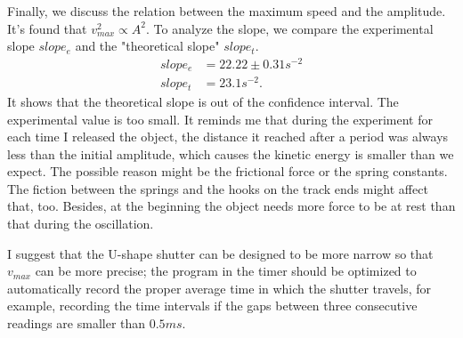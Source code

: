    Finally, we discuss the relation between the maximum speed and the amplitude. It's found that $v_{max}^2\propto A^2$. To analyze the slope, we compare the experimental slope $slope_e$ and the "theoretical slope" $slope_t$.
    \[
    \begin{split}
        slope_e&=22.22\pm0.31s^{-2}\\
        slope_t&=23.1s^{-2}.
    \end{split}
    \]
    It shows that the theoretical slope is out of the confidence interval. The experimental value is too small. It reminds me that during the experiment for each time I released the object, the distance it reached after a period was always less than the initial amplitude, which causes the kinetic energy is smaller than we expect. The possible reason might be the frictional force or the spring constants. The fiction between the springs and the hooks on the track ends might affect that, too. Besides, at the beginning the object needs more force to be at rest than that during the oscillation.
    
    I suggest that the U-shape shutter can be designed to be more narrow so that $v_{max}$ can be more precise; the program in the timer should be optimized to automatically record the proper average time in which the shutter travels, for example, recording the time intervals if the gaps between three consecutive readings are smaller than $0.5ms$.